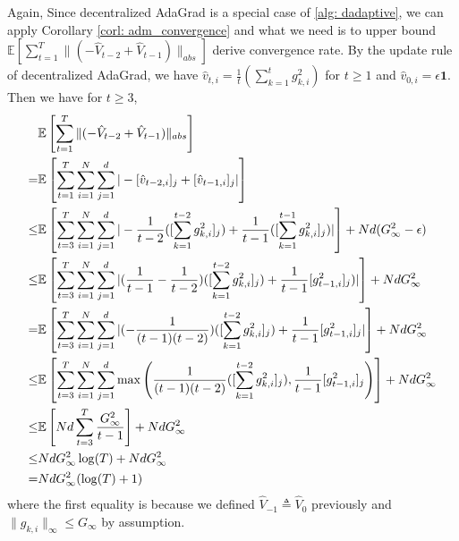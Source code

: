 \documentclass[anon,12pt]{colt2021} %
\begin{document}
Again, Since decentralized AdaGrad is a special case of \ref{alg: dadaptive}, we can apply Corollary \ref{corl: adm_convergence} and what we need is to upper bound  $\mathbb E \left[ \sum_{t=1}^{T}   \|    (- \hat V_{t-2} + \hat V_{t-1} ) \|_{abs} \right]  $  derive convergence rate.  By the update rule of decentralized AdaGrad, we have $\hat v_{t,i} = \frac{1}{t}( \sum_{k=1}^{t}g_{k,i}^2)$ for $t \geq 1$ and $\hat v_{0,i} = \epsilon \mathbf 1$. Then we have for $t \geq 3$,
\begin{align}\notag
\begin{split}
&\mathbb E \left[ \sum_{t=1}^{T}   \|    (- \hat V_{t-2} + \hat V_{t-1} ) \|_{abs} \right] \\
= &\mathbb E \left[ \sum_{t=1}^{T}  \sum_{i=1}^N \sum_{j=1}^d    |- [\hat v_{t-2,i}]_j + [\hat v_{t-1,i}]_j | \right]    \\
\leq &\mathbb E \left[ \sum_{t=3}^{T}  \sum_{i=1}^N \sum_{j=1}^d    |- \frac{1}{t-2}( [\sum_{k=1}^{t-2}g_{k,i}^2]_j) + \frac{1}{t-1}([ \sum_{k=1}^{t-1}g_{k,i}^2]_j )| \right] + Nd (G_{\infty}^2 - \epsilon)  \\
\leq &\mathbb E \left[ \sum_{t=3}^{T}  \sum_{i=1}^N \sum_{j=1}^d    | (\frac{1}{t-1} - \frac{1}{t-2})( [\sum_{k=1}^{t-2}g_{k,i}^2]_j) + \frac{1}{t-1} [g_{t-1,i}^2]_j )| \right] +  Nd G_{\infty}^2    \\
=  &\mathbb E \left[ \sum_{t=3}^{T}  \sum_{i=1}^N \sum_{j=1}^d    | (-\frac{1}{(t-1)(t-2)} )( [\sum_{k=1}^{t-2}g_{k,i}^2]_j) + \frac{1}{t-1}[g_{t-1,i}^2]_j | \right]    +  Nd G_{\infty}^2 \\
\leq &\mathbb E \left[ \sum_{t=3}^{T}  \sum_{i=1}^N \sum_{j=1}^d    \max\left( \frac{1}{(t-1)(t-2)} ( [\sum_{k=1}^{t-2}g_{k,i}^2]_j) , \frac{1}{t-1}[g_{t-1,i}^2]_j \right) \right]    +  Nd G_{\infty}^2 \\
\leq  &\mathbb E \left[ N d \sum_{t=3}^{T}      \frac{G_{\infty}^2}{t-1}   \right]   +  Nd G_{\infty}^2 \\
\leq & Nd G_{\infty}^2 \log (T) +  Nd G_{\infty}^2 \\
= & NdG_{\infty}^2 (\log (T) + 1)
\end{split}
\end{align}
where the first equality is because  we defined $\hat V_{-1} \triangleq \hat V_0$  previously and $\|g_{k,i}\|_{\infty} \leq G_{\infty}$ by assumption.
\end{document}
